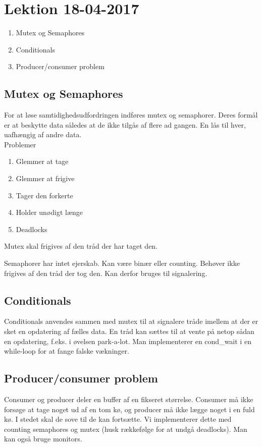 \section{Lektion 18-04-2017}

\begin{enumerate}
	\item Mutex og Semaphores
	\item Conditionals
	\item Producer/consumer problem
\end{enumerate}

\subsection{Mutex og Semaphores}
For at løse samtidighedsudfordringen indføres mutex og semaphorer. Deres formål er at beskytte data således at de ikke tilgås af flere ad gangen. En lås til hver, uafhængig af andre data.\\

\noindent Problemer
\begin{enumerate}
	\item Glemmer at tage
	\item Glemmer at frigive
	\item Tager den forkerte
	\item Holder unødigt længe
	\item Deadlocks
\end{enumerate}


\noindent Mutex skal frigives af den tråd der har taget den. 

\noindent Semaphorer har intet ejerskab. Kan være binær eller counting. Behøver ikke frigives af den tråd der tog den. Kan derfor bruges til signalering.

\subsection{Conditionals}
Conditionals anvendes sammen med mutex til at signalere tråde imellem at der er sket en opdatering af fælles data. En tråd kan sættes til at vente på netop sådan en opdatering, f.eks. i øvelsen park-a-lot. Man implementerer en cond\_wait i en while-loop for at fange falske vækninger.


\subsection{Producer/consumer problem}
Consumer og producer deler en buffer af en fikseret størrelse. Consumer må ikke forsøge at tage noget ud af en tom kø, og producer må ikke lægge noget i en fuld kø. I stedet skal de sove til de kan fortsætte. Vi implementerer dette med counting semaphores og mutex (husk rækkefølge for at undgå deadlocks). Man kan også bruge monitors.
